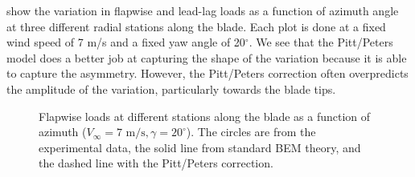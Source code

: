\documentclass[]{aiaa-tc}%
\begin{document}
 show the variation in flapwise and lead-lag loads as a function of azimuth angle at three different radial stations along the blade.  Each plot is done at a fixed wind speed of 7 m/s and a fixed yaw angle of 20$^\circ$.  We see that the Pitt/Peters model does a better job at capturing the shape of the variation because it is able to capture the asymmetry.  However, the Pitt/Peters correction often overpredicts the amplitude of the variation, particularly towards the blade tips.  

\begin{figure}[htbp]
\centering
 \quad
 \quad
 \caption{Flapwise loads at different stations along the blade as a function of azimuth ($V_\infty = 7 \textrm{ m/s}, \gamma = 20^\circ$). The circles are from the experimental data, the solid line from standard BEM theory, and the dashed line with the Pitt/Peters correction.}
 \label{fig:azimuth_Np}
\end{figure}
\end{document}
